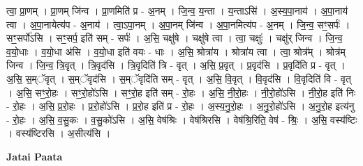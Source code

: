 \documentclass[17pt]{extarticle}
\begin{document}
त्वा॒ प्रा॒णम् । प्रा॒णम् जि॑न्व । प्रा॒णमिति॑ प्र - अ॒नम् । जि॒न्व॒ य॒न्ता । य॒न्ताऽसि॑ । अ॒स्य॒पा॒नाय॑ । अ॒पा॒नाय॑ त्वा । अ॒पा॒नायेत्य॑प - अ॒नाय॑ । त्वा॒ऽपा॒नम् । अ॒पा॒नम् जि॑न्व । अ॒पा॒नमित्य॑प - अ॒नम् । जि॒न्व॒ सꣳ॒॒सर्पः॑ । सꣳ॒॒सर्पो॑ऽसि । सꣳ॒॒सर्प॒ इति॑ सम् - सर्पः॑ । अ॒सि॒ चक्षु॑षे । चक्षु॑षे त्वा । त्वा॒ चक्षुः॑ । चक्षु॑र् जिन्व । जि॒न्व॒ व॒यो॒धाः । व॒यो॒धा अ॑सि । व॒यो॒धा इति॑ वयः - धाः । अ॒सि॒ श्रोत्रा॑य । श्रोत्रा॑य त्वा । त्वा॒ श्रोत्र᳚म् । श्रोत्र॑म् जिन्व । जि॒न्व॒ त्रि॒वृत् । त्रि॒वृद॑सि । त्रि॒वृदिति॑ त्रि - वृत् । अ॒सि॒ प्र॒वृत् । प्र॒वृद॑सि । प्र॒वृदि॑ति प्र - वृत् । अ॒सि॒ स॒म्ॅवृत् । स॒म्ॅवृद॑सि । स॒म्ॅवृदि॑ति सम् - वृत् । अ॒सि॒ वि॒वृत् । वि॒वृद॑सि । वि॒वृदिति॑ वि - वृत् । अ॒सि॒ सꣳ॒॒रो॒हः । सꣳ॒॒रो॒हो॑ऽसि । सꣳ॒॒रो॒ह इति॑ सम् - रो॒हः । अ॒सि॒ नी॒रो॒हः । नी॒रो॒हो॑ऽसि । नी॒रो॒ह इति॑ निः - रो॒हः । अ॒सि॒ प्र॒रो॒हः । प्र॒रो॒हो॑ऽसि । प्र॒रो॒ह इति॑ प्र - रो॒हः । अ॒स्य॒नु॒रो॒हः । अ॒नु॒रो॒हो॑ऽसि । अ॒नु॒रो॒ह इत्य॑नु - रो॒हः । अ॒सि॒ व॒सु॒कः । व॒सु॒को॑ऽसि । अ॒सि॒ वेष॑श्रिः । वेष॑श्रिरसि । वेष॑श्रि॒रिति॒ वेष॑ - श्रिः॒ । अ॒सि॒ वस्य॑ष्टिः । वस्य॑ष्टिरसि । 
अ॒सीत्य॑सि । \newline

\textbf{Jatai Paata} \newline
\end{document}
